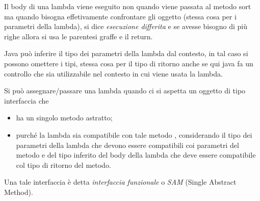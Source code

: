Il body di una lambda viene eseguito non quando viene passata al metodo sort ma quando bisogna effetivamente confrontare gli oggetto (stessa cosa per i parametri 
della lambda), si dice \textit{esecuzione differita} e se avesse bisogno di più righe allora si usa le parentesi graffe e il return.

Java può inferire il tipo dei parametri della lambda dal contesto, in tal caso si possono omettere i tipi, stessa cosa per il tipo di ritorno anche se qui java fa un 
controllo che sia utilizzabile nel contesto in cui viene usata la lambda.

Si può assegnare/passare una lambda quando ci si aspetta un oggetto di tipo interfaccia che
\begin{itemize}
    \item ha un singolo metodo astratto;
    \item purché la lambda sia compatibile con tale metodo , considerando il tipo dei parametri della lambda che devono essere compatibili coi parametri del metodo 
    e del tipo inferito del body della lambda che deve essere compatibile col tipo di ritorno del metodo.
\end{itemize}

Una tale interfaccia è detta \textit{interfaccia funzionale} o \textit{SAM} (Single Abstract Method).

